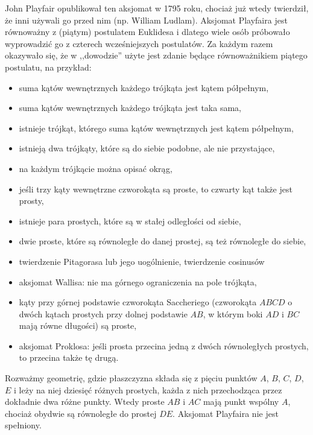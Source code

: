 John Playfair opublikował ten aksjomat w 1795 roku, chociaż już wtedy twierdził, że inni używali go przed nim (np. William Ludlam).
%
Aksjomat Playfaira jest równoważny z (piątym) postulatem Euklidesa i dlatego wiele osób próbowało wyprowadzić go z czterech wcześniejszych postulatów.
Za każdym razem okazywało się, że w ,,dowodzie'' użyte jest zdanie będące równoważnikiem piątego postulatu, na przykład:
\begin{itemize}
    \item suma kątów wewnętrznych każdego trójkąta jest kątem półpełnym,
    \item suma kątów wewnętrznych każdego trójkąta jest taka sama,
    \item istnieje trójkąt, którego suma kątów wewnętrznych jest kątem półpełnym,
    \item istnieją dwa trójkąty, które są do siebie podobne, ale nie przystające,
    \item na każdym trójkącie można opisać okrąg,
    \item jeśli trzy kąty wewnętrzne czworokąta są proste, to czwarty kąt także jest prosty,
    \item istnieje para prostych, które są w stałej odległości od siebie,
    \item dwie proste, które są równoległe do danej prostej, są też równoległe do siebie,
    \item twierdzenie Pitagorasa lub jego uogólnienie, twierdzenie cosinusów
    \item aksjomat Wallisa: nie ma górnego ograniczenia na pole trójkąta,
    \item kąty przy górnej podstawie czworokąta Saccheriego (czworokąta $ABCD$ o dwóch kątach prostych przy dolnej podstawie $AB$, w którym boki $AD$ i $BC$ mają równe długości) są proste,
    \item aksjomat Proklosa: jeśli prosta przecina jedną z dwóch równoległych prostych, to przecina także tę drugą.
\end{itemize}

\begin{example}
    Rozważmy geometrię, gdzie płaszczyzna składa się z pięciu punktów $A$, $B$, $C$, $D$, $E$ i leży na niej dziesięć różnych prostych, każda z nich przechodząca przez dokładnie dwa różne punkty.
    Wtedy proste $AB$ i $AC$ mają punkt wspólny $A$, chociaż obydwie są równoległe do prostej $DE$.
    Aksjomat Playfaira nie jest spełniony.
\end{example}


